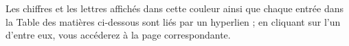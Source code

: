 \bigskip
Les chiffres et les lettres affichés {\color{MyBlue} dans cette couleur} ainsi que chaque entrée dans la Table des matières ci-dessous sont liés par un hyperlien ; en cliquant sur l'un d'entre eux, vous accéderez à la page correspondante. 

